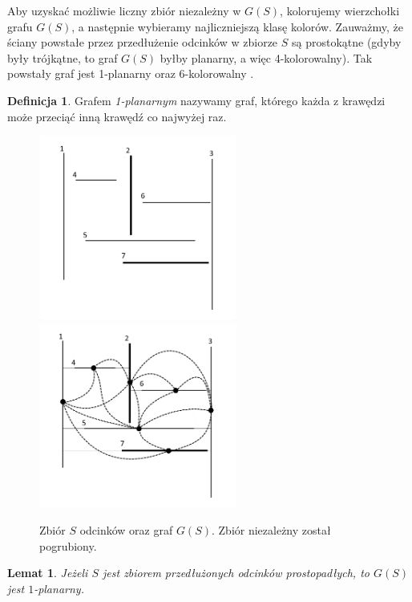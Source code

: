 \documentclass{xmgr}
\newtheorem{Lemat}{Lemat}
\theoremstyle{definition}
\newtheorem{Definicja}{Definicja}
\begin{document}
\indent Aby uzyskać możliwie liczny zbiór niezależny w $G(S)$, kolorujemy wierzchołki grafu $G(S)$, a następnie wybieramy najliczniejszą klasę kolorów. Zauważmy, że ściany powstałe przez przedłużenie odcinków w zbiorze $S$ są prostokątne (gdyby były trójkątne, to graf $G(S)$ byłby planarny, a więc 4-kolorowalny). 
Tak powstały graf jest 1-planarny oraz 6-kolorowalny \cite{borodin}.

\begin{Definicja}
  Grafem \emph{1-planarnym} nazywamy graf, którego każda z krawędzi może przeciąć inną krawędź co najwyżej raz.
\end{Definicja}
\begin{figure}[ht!]
  \centering
  \includegraphics[width=6.5cm]{rysunki/zbior_odcinkow.png}
  \includegraphics[width=6.5cm]{rysunki/graf_zbioru_odcinkow.png}
  \caption{Zbiór $S$ odcinków oraz graf $G(S)$. Zbiór niezależny został pogrubiony.}
  \label{fig:przedluzone odcinki}
\end{figure} 

\begin{Lemat} \cite{knadajniki}
  Jeżeli $S$ jest zbiorem przedłużonych odcinków prostopadłych, to $G(S)$ jest $1$-planarny.
\end{Lemat}
\end{document}
